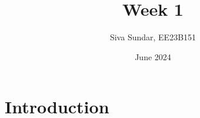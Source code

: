 \documentclass{article}
\title{Week 1}
\author{Siva Sundar, EE23B151}
\date{June 2024}
\begin{document}
\maketitle

\section{Introduction}

\pagestyle{fancy}
\fancyfoot{}
\renewcommand{\footrulewidth}{1pt}
\end{document}
